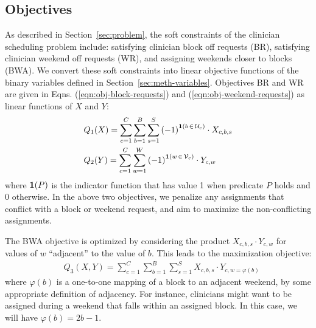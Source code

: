 \subsection{Objectives}\label{sec:meth-objectives}
As described in Section~\ref{sec:problem}, the soft constraints of the clinician
scheduling problem include: satisfying clinician block off requests (BR),
satisfying clinician weekend off requests (WR), and assigning weekends closer to
blocks (BWA). We convert these soft constraints into linear objective functions
of the binary variables defined in Section~\ref{sec:meth-variables}. 
Objectives BR and WR are given in Eqns. (\ref{eqn:obj-block-requests}) and (\ref{eqn:obj-weekend-requests})
as linear functions of $X$ and $Y$:
\begin{align}
&Q_1(X) = \sum_{c=1}^{C} \sum_{b=1}^{B} \sum_{s=1}^{S}
{(-1)}^{\bm{1}(b\,\in\,\mathcal{U}_c)}\cdot X_{c, b, s}
\label{eqn:obj-block-requests}\\
&Q_2(Y) = \sum_{c=1}^{C} \sum_{w=1}^{W}
{(-1)}^{\bm{1}(w\,\in\,\mathcal{V}_c)}\cdot Y_{c, w}
\label{eqn:obj-weekend-requests}
\end{align}
where $\bm{1}(P)$ is the indicator function that has value 1 when predicate $P$
holds and 0 otherwise. In the above two objectives, we penalize any assignments
that conflict with a block or weekend request, and aim to maximize the
non-conflicting assignments.

The BWA objective is optimized by considering the product $X_{c, b, s}\cdot Y_{c, w}$ 
for values of $w$ ``adjacent'' to the value of $b$. This
leads to the maximization objective:%
\begin{align}
&Q_3(X, Y) = \sum_{c=1}^{C} \sum_{b=1}^{B} \sum_{s=1}^{S} X_{c, b, s}\cdot Y_{c,
	w=\varphi(b)} \label{eqn:obj-block-weekend-adj}
\end{align}
where $\varphi(b)$ is a one-to-one mapping of a block to an adjacent weekend, by
some appropriate definition of adjacency. For instance, clinicians might want to
be assigned during a weekend that falls within an assigned block. In this case,
we will have $\varphi(b) = 2b-1$.

